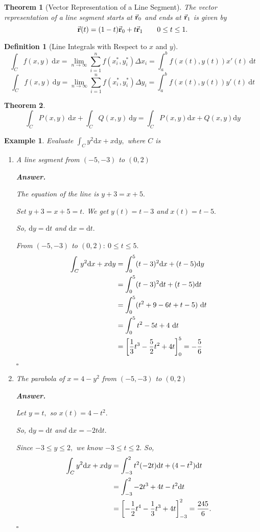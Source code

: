 \documentclass[12pt,a4paper]{article}
\newtheorem{thm}{Theorem}[subsection]
\newtheorem{df}{Definition}[subsection]
\newtheorem{eg}{Example}[subsection]
\newenvironment*{ans}{\par\indent\textbf{\textit{Answer. }}\par}{\par\hfill{$\square$}\par}
\def\dsst{\displaystyle}
\def\d{{\mathrm{d}}}
\def\dx{\d x}
\def\dy{\d y}
\def\dt{\d t}
\def\intC{\dsst\int_C}
\def\vecr{\va{{\textbf{r}}}}
\begin{document}
\begin{thm}[Vector Representation of a Line Segment]
	The vector representation of a line segment starts at $\vecr_0$ and ends at $\vecr_1$ is given by \[\vecr(t)=(1-t)\vecr_0+t\vecr_1\qquad0\leq t\leq1.\]	
\end{thm}
\begin{df}[Line Integrals with Respect to $x$ and $y$]
	\[\intC f(x,y)\ \dx=\lim_{n\to\infty}\sum_{i=1}^nf(x_i^*, y_i^*)\Delta x_i=\int_a^bf(x(t), y(t))x'(t)\ \dt\]
	\[\intC f(x,y)\ \dy=\lim_{n\to\infty}\sum_{i=1}^nf(x_i^*, y_i^*)\Delta y_i=\int_a^bf(x(t), y(t))y'(t)\ \dt\]	
\end{df}
\begin{thm}
	\[\intC P(x,y)\ \dx+\intC Q(x,y)\ \dy=\intC P(x,y)\dx+Q(x,y)\dy\]	
\end{thm}
\begin{eg}
	Evaluate $\intC y^2\dx+x\dy,$ where $C$ is 
	\begin{enumerate}
		\item A line segment from $(-5,-3)$ to $(0,2)$
		\begin{ans}
			The equation of the line is $y+3=x+5.$\par Set $y+3=x+5=t.$ We get $y(t)=t-3$ and $x(t)=t-5.$\par So, $\dy=\dt$ and $\dx=\dt.$\par From $(-5,-3)$ to $(0,2):\ 0\leq t\leq5.$ \[\begin{aligned}\intC y^2\dx+x\dy&=\int_0^5(t-3)^2\dx+(t-5)\dy\\&=\int_0^5(t-3)^2\dt+(t-5)\dt\\&=\int_0^5(t^2+9-6t+t-5)\ \dt\\&=\int_0^5 t^2-5t+4\ \dt\\&=\qty[\dfrac{1}{3}t^3-\dfrac{5}{2}t^2+4t]_0^5=-\dfrac{5}{6}\end{aligned}\]
		\end{ans}
		\item The parabola of $x=4-y^2$ from $(-5,-3)$ to $(0,2)$
		\begin{ans}
			Let $y=t,$ so $x(t)=4-t^2.$\par So, $\dy=\dt$ and $\dx=-2t\dt.$\par Since $-3\leq y\leq2,$ we know $-3\leq t\leq2.$ So, \[\begin{aligned}\intC y^2\dx+x\dy&=\int_{-3}^2t^2(-2t)\dt+(4-t^2)\dt\\&=\int_{-3}^2-2t^3+4t-t^2\dt\\&=\qty[-\dfrac{1}{2}t^4-\dfrac{1}{3}t^3+4t]_{-3}^2=\dfrac{245}{6}.\end{aligned}\]
		\end{ans}
	\end{enumerate}	
\end{eg}
\end{document}
